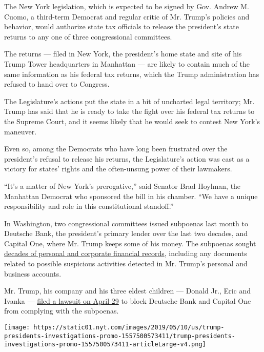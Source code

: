 The New York legislation, which is expected to be signed by Gov. Andrew
M. Cuomo, a third-term Democrat and regular critic of Mr. Trump's
policies and behavior, would authorize state tax officials to release
the president's state returns to any one of three congressional
committees.

The returns --- filed in New York, the president's home state and site
of his Trump Tower headquarters in Manhattan --- are likely to contain
much of the same information as his federal tax returns, which the Trump
administration has refused to hand over to Congress.

The Legislature's actions put the state in a bit of uncharted legal
territory; Mr. Trump has said that he is ready to take the fight over
his federal tax returns to the Supreme Court, and it seems likely that
he would seek to contest New York's maneuver.

Even so, among the Democrats who have long been frustrated over the
president's refusal to release his returns, the Legislature's action was
cast as a victory for states' rights and the often-unsung power of their
lawmakers.

``It's a matter of New York's prerogative,'' said Senator Brad Hoylman,
the Manhattan Democrat who sponsored the bill in his chamber. ``We have
a unique responsibility and role in this constitutional standoff.''

In Washington, two congressional committees issued subpoenas last month
to Deutsche Bank, the president's primary lender over the last two
decades, and Capital One, where Mr. Trump keeps some of his money. The
subpoenas sought
\href{https://www.nytimes.com/2019/04/30/business/deutsche-bank-donald-trump.html?module=inline}{decades
of personal and corporate financial records}, including any documents
related to possible suspicious activities detected in Mr. Trump's
personal and business accounts.

Mr. Trump, his company and his three eldest children --- Donald Jr.,
Eric and Ivanka ---
\href{https://www.nytimes.com/2019/04/29/us/politics/trump-lawsuit-deutsche-bank.html?module=inline}{filed
a lawsuit on April 29} to block Deutsche Bank and Capital One from
complying with the subpoenas.

\href{https://www.nytimes.com/interactive/2019/05/13/us/politics/trump-investigations.html}{}

\texttt{[image: https://static01.nyt.com/images/2019/05/10/us/trump-presidents-investigations-promo-1557500573411/trump-presidents-investigations-promo-1557500573411-articleLarge-v4.png]}

